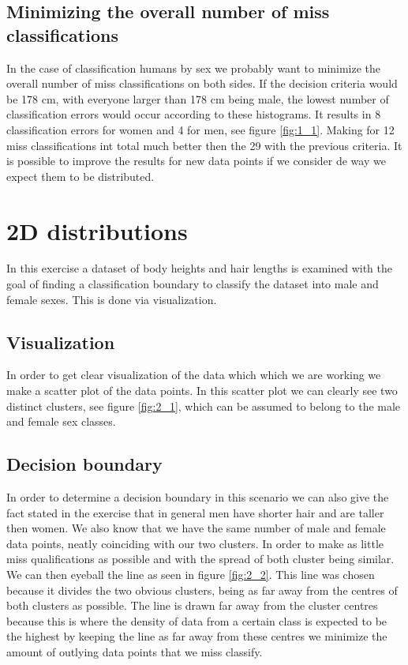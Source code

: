 \documentclass[10pt,a4paper]{article}
\begin{document}
\subsection{Minimizing the overall number of miss classifications}
In the case of classification humans by sex we probably want to minimize the overall number of miss classifications on both sides. If the decision criteria would be 178 cm, with everyone larger than 178 cm being male, the lowest number of classification errors would occur according to these histograms. It results in 8 classification errors for women and 4 for men, see figure \ref{fig:1_1}. Making for 12 miss classifications int total much better then the 29 with the previous criteria. It is possible to improve the results for new data points if we consider de way we expect them to be distributed.

\section{2D distributions}
In this exercise a dataset of body heights and hair lengths is examined with the goal of finding a classification boundary to classify the dataset into male and female sexes. This is done via visualization.

\subsection{Visualization}
In order to get clear visualization of the data which which we are working we make a scatter plot of the data points. In this scatter plot we can clearly see two distinct clusters, see figure \ref{fig:2_1}, which can be assumed to belong to the male and female sex classes.

\subsection{Decision boundary}
In order to determine a decision boundary in this scenario we can also give the fact stated in the exercise that in general men have shorter hair and are taller then women. We also know that we have the same number of male and female data points, neatly coinciding with our two clusters. In order to make as little miss qualifications as possible and with the spread of both cluster being similar. We can then eyeball the line as seen in figure \ref{fig:2_2}. This line was chosen because it divides the two obvious clusters, being as far away from the centres of both clusters as possible. The line is drawn far away from the cluster centres because this is where the density of data from a certain class is expected to be the highest by keeping the line as far away from these centres we minimize the amount of outlying data points that we miss classify.
\end{document}

